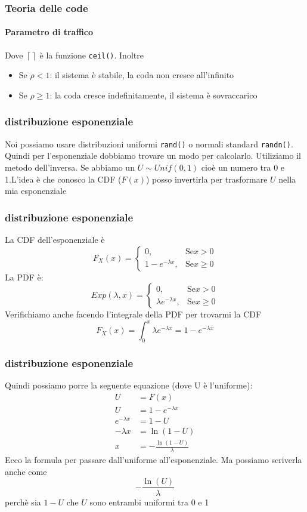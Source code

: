 \documentclass{beamer}
\begin{document}
\begin{frame}
        \frametitle{Teoria delle code}
        \framesubtitle{Parametro di traffico}
        Dove $\left \lceil\right \rceil$ è la funzione \texttt{ceil()}. Inoltre
        \begin{itemize}
            \item Se $\rho < 1$: il sistema è stabile, la coda non cresce all'infinito
            \item Se $\rho \geq 1$: la coda cresce indefinitamente, il sistema è sovraccarico 
        \end{itemize}
        
\end{frame}

\begin{frame}
    \frametitle{distribuzione esponenziale}
    Noi possiamo usare distribuzioni uniformi \texttt{rand()} o normali standard \texttt{randn()}. Quindi per l'esponenziale dobbiamo trovare un modo per calcolarlo.
    Utiliziamo il metodo dell'inversa.
    Se abbiamo un $U \sim Unif(0,1)$ cioè un numero tra 0 e 1.L'idea è che conosco la CDF ($F(x)$) posso invertirla per trasformare $U$ nella mia esponenziale
\end{frame}

\begin{frame}
    \frametitle{distribuzione esponenziale}
    La CDF dell'esponenziale è
    \[F_X(x)=\begin{cases}
        0,& \mbox{Se} x>0\\
        1-e^{-\lambda x},& \mbox{Se} x\geq 0
    \end{cases}\]
    La PDF è:
    \[Exp(\lambda,x)=\begin{cases}
        0,& \mbox{Se} x>0\\
        \lambda e^{-\lambda x},& \mbox{Se} x\geq 0
    \end{cases}\]
    Verifichiamo anche facendo l'integrale della PDF per trovarmi la CDF
    \[F_X(x)=\int_0^x{\lambda e^{-\lambda x}}= 1-e^{-\lambda x}\]
\end{frame}

\begin{frame}
    \frametitle{distribuzione esponenziale}
    Quindi possiamo porre la seguente equazione (dove U è l'uniforme):
    \begin{align}
        U&=F(x)\\
        U&=1-e^{-\lambda x}\\
        e^{-\lambda x}&=1-U\\
        -\lambda x&=\ln{(1-U)}\\
         x&=-\frac{\ln{(1-U)}}{\lambda}
    \end{align}
    Ecco la formula per passare dall'uniforme all'esponenziale. Ma possiamo scriverla anche come
    \[-\frac{\ln{(U)}}{\lambda}\]
    perchè sia $1-U$ che $U$ sono entrambi uniformi tra 0 e 1
\end{frame}
\end{document}
